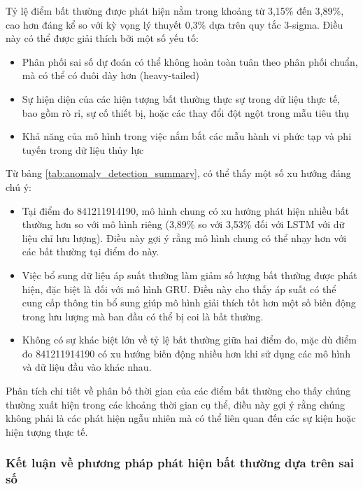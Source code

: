 Tỷ lệ điểm bất thường được phát hiện nằm trong khoảng từ 3,15\% đến 3,89\%, cao hơn đáng kể so với kỳ vọng lý thuyết 0,3\% dựa trên quy tắc 3-sigma. Điều này có thể được giải thích bởi một số yếu tố:

\begin{itemize}
    \item Phân phối sai số dự đoán có thể không hoàn toàn tuân theo phân phối chuẩn, mà có thể có đuôi dày hơn (heavy-tailed)
    \item Sự hiện diện của các hiện tượng bất thường thực sự trong dữ liệu thực tế, bao gồm rò rỉ, sự cố thiết bị, hoặc các thay đổi đột ngột trong mẫu tiêu thụ
    \item Khả năng của mô hình trong việc nắm bắt các mẫu hành vi phức tạp và phi tuyến trong dữ liệu thủy lực
\end{itemize}

Từ bảng \ref{tab:anomaly_detection_summary}, có thể thấy một số xu hướng đáng chú ý:

\begin{itemize}
    \item Tại điểm đo 841211914190, mô hình chung có xu hướng phát hiện nhiều bất thường hơn so với mô hình riêng (3,89\% so với 3,53\% đối với LSTM với dữ liệu chỉ lưu lượng). Điều này gợi ý rằng mô hình chung có thể nhạy hơn với các bất thường tại điểm đo này.
    
    \item Việc bổ sung dữ liệu áp suất thường làm giảm số lượng bất thường được phát hiện, đặc biệt là đối với mô hình GRU. Điều này cho thấy áp suất có thể cung cấp thông tin bổ sung giúp mô hình giải thích tốt hơn một số biến động trong lưu lượng mà ban đầu có thể bị coi là bất thường.
    
    \item Không có sự khác biệt lớn về tỷ lệ bất thường giữa hai điểm đo, mặc dù điểm đo 841211914190 có xu hướng biến động nhiều hơn khi sử dụng các mô hình và dữ liệu đầu vào khác nhau.
\end{itemize}

Phân tích chi tiết về phân bố thời gian của các điểm bất thường cho thấy chúng thường xuất hiện trong các khoảng thời gian cụ thể, điều này gợi ý rằng chúng không phải là các phát hiện ngẫu nhiên mà có thể liên quan đến các sự kiện hoặc hiện tượng thực tế.

\subsubsection{Kết luận về phương pháp phát hiện bất thường dựa trên sai số}

